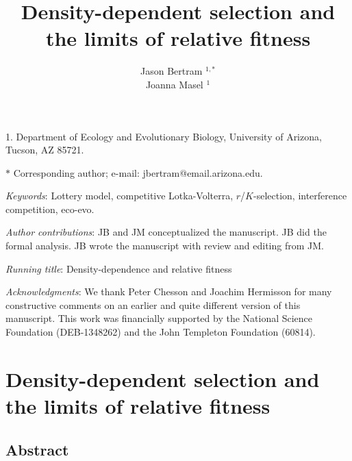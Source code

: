 \documentclass[12pt]{article}
\title{Density-dependent selection and the limits of relative fitness}
\author{Jason Bertram $^{1,\ast}$ \\ 
Joanna Masel $^{1}$}
\date{}
\begin{document}
\maketitle

\noindent{}1. Department of Ecology and Evolutionary Biology, University of Arizona, Tucson, AZ 85721.

\noindent{}$\ast$ Corresponding author; e-mail: jbertram@email.arizona.edu.

\bigskip

\textit{Keywords}: Lottery model, competitive Lotka-Volterra, $r$/$K$-selection, interference competition, eco-evo.

\bigskip

\textit{Author contributions}: JB and JM conceptualized the manuscript. JB did the formal analysis. JB wrote the manuscript with review and editing from JM. 

\bigskip

\textit{Running title}: Density-dependence and relative fitness

\bigskip

\textit{Acknowledgments}: We thank Peter Chesson and Joachim Hermisson for many constructive comments on an earlier and quite different version of this manuscript. This work was financially supported by the National Science Foundation (DEB-1348262) and the John Templeton Foundation (60814).

\linenumbers{}
\modulolinenumbers[1]

\newpage{}


\section*{\centering \huge  Density-dependent selection and the limits of relative fitness}

\bigskip

\subsection*{Abstract}
\end{document}

